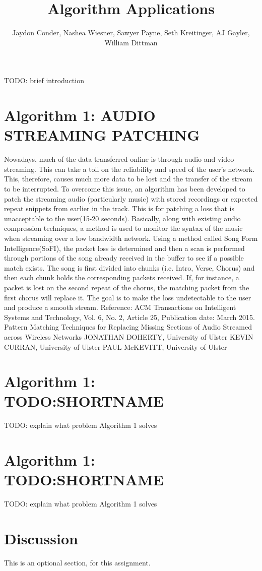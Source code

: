 \documentclass[11pt]{article}
\title{Algorithm Applications} %
\author{Jaydon Conder, Nashea Wiesner, Sawyer Payne, Seth Kreitinger, AJ Gayler, William Dittman}
\begin{document}
\maketitle

TODO: brief introduction

\section{Algorithm 1: AUDIO STREAMING PATCHING}
Nowadays, much of the data transferred online is through audio and video streaming. This can take a toll on the
reliability and speed of the user's network.  This, therefore, causes much more data to be lost and the transfer 
of the stream to be interrupted.  To overcome this issue, an algorithm has been developed to patch the streaming
audio (particularly music) with stored recordings or expected repeat snippets from earlier in the track.  This 
is for patching a loss that is unacceptable to the user(15-20 seconds).  Basically, along with existing audio compression 
techniques, a method is used to monitor the syntax of the music when streaming over a low bandwidth network.  
Using a method called Song Form Intelligence(SoFI), the packet loss is determined and then a scan is performed through portions of the song already received in the buffer to see if a possible match exists.  The song is first divided into chunks (i.e. 
Intro, Verse, Chorus)  and then each chunk holds the corresponding packets received.  If, for instance, a packet is lost 
on the second repeat of the chorus, the matching packet from the first chorus will replace it.  The goal is to make
the loss undetectable to the user and produce a smooth stream.
Reference: ACM Transactions on Intelligent Systems and Technology, Vol. 6, No. 2, Article 25, Publication date: March 2015.
Pattern Matching Techniques for Replacing Missing Sections of
Audio Streamed across Wireless Networks
JONATHAN DOHERTY, University of Ulster
KEVIN CURRAN, University of Ulster
PAUL McKEVITT, University of Ulster


\section{Algorithm 1: TODO:SHORTNAME}
TODO: explain what problem Algorithm 1 solves

\section{Algorithm 1: TODO:SHORTNAME}
TODO: explain what problem Algorithm 1 solves

\section{Discussion}
This is an optional section, for this assignment.
\end{document}
